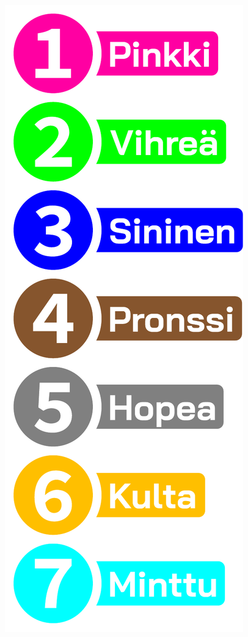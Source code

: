 \documentclass{article}
\begin{document}

\noindent\begin{minipage}[t]{0.22\textwidth} %
	\vspace*{-3em}
	\includegraphics[width=\textwidth]{titles.pdf}  %
\end{minipage}%
\end{document}
